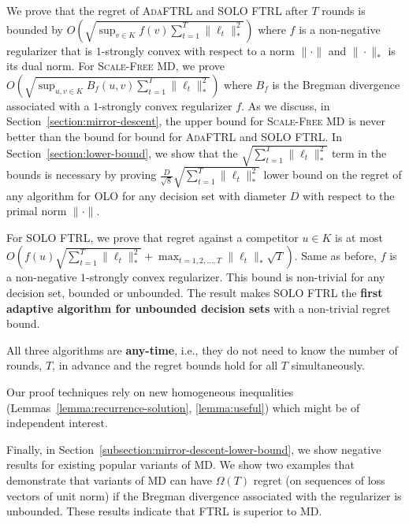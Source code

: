 We prove that the regret of \textsc{AdaFTRL} and \textsc{SOLO FTRL} after $T$
rounds is bounded by $O (\sqrt{\sup_{v \in K} f(v)
\sum_{t=1}^T\|\ell_t\|_*^2} )$ where $f$ is a non-negative regularizer
that is $1$-strongly convex with respect to a norm $\|\cdot\|$ and
$\|\cdot\|_*$ is its dual norm. For \textsc{Scale-Free MD}, we prove $O
(\sqrt{\sup_{u,v \in K} B_f(u,v) \sum_{t=1}^T\|\ell_t\|_*^2} )$
where $B_f$ is the Bregman divergence associated with a $1$-strongly convex
regularizer $f$.  As we discuss, in Section~\ref{section:mirror-descent}, the
upper bound for \textsc{Scale-Free MD} is never better than the bound for bound
for \textsc{AdaFTRL} and \textsc{SOLO FTRL}.  In
Section~\ref{section:lower-bound}, we show that the $\sqrt{\sum_{t=1}^T
\|\ell_t\|_*^2}$ term in the bounds is necessary by proving $\frac{D}{\sqrt{8}}
\sqrt{\sum_{t=1}^T\|\ell_t\|_*^2}$ lower bound on the regret of any algorithm
for OLO for any decision set with diameter $D$ with respect to the primal norm
$\|\cdot\|$.

For \textsc{SOLO FTRL}, we prove that regret against a competitor $u \in K$ is
at most $O (f(u) \sqrt{\sum_{t=1}^T \|\ell_t\|_*^2} + \max_{t=1,2,\dots,T}
\|\ell_t\|_* \sqrt{T} )$.  Same as before, $f$ is a non-negative
$1$-strongly convex regularizer. This bound is non-trivial for any decision
set, bounded or unbounded.  The result makes \textsc{SOLO FTRL} the
\textbf{first adaptive algorithm for unbounded decision sets} with a
non-trivial regret bound.

All three algorithms are \textbf{any-time}, i.e., they do not need to know the
number of rounds, $T$, in advance and the regret bounds hold for all $T$
simultaneously.

Our proof techniques rely on new homogeneous
inequalities (Lemmas~\ref{lemma:recurrence-solution}, \ref{lemma:useful})
which might be of independent interest.

Finally, in Section~\ref{subsection:mirror-descent-lower-bound}, we show
negative results for existing popular variants of \textsc{MD}. We show two
examples that demonstrate that variants of \textsc{MD} can have $\Omega(T)$
regret (on sequences of loss vectors of unit norm) if the Bregman divergence
associated with the regularizer is unbounded.
These results indicate that \textsc{FTRL} is superior to \textsc{MD}.
